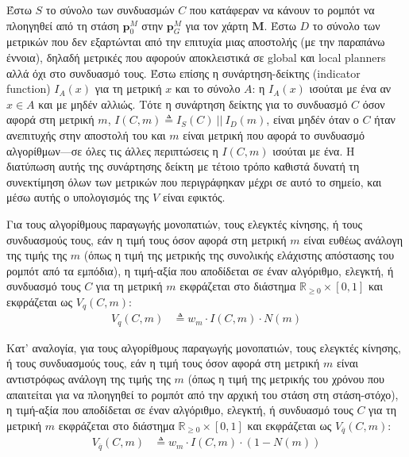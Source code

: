 Έστω $S$ το σύνολο των συνδυασμών $C$ που κατάφεραν να κάνουν το ρομπότ να
πλοηγηθεί από τη στάση $\bm{p}_0^M$ στην $\bm{p}_G^M$ για τον χάρτη $\bm{M}$.
Έστω $D$ το σύνολο των μετρικών που δεν εξαρτώνται από την επιτυχία μιας
αποστολής (με την παραπάνω έννοια), δηλαδή μετρικές που αφορούν αποκλειστικά σε
global και local planners αλλά όχι στο συνδυασμό τους. Έστω επίσης η
συνάρτηση-δείκτης (indicator function) $I_A(x)$ για τη μετρική $x$ και το
σύνολο $A$: η $I_A(x)$ ισούται με ένα αν $x \in A$ και με μηδέν αλλιώς. Τότε η
συνάρτηση δείκτης για το συνδυασμό $C$ όσον αφορά στη μετρική $m$, $I(C,m)
\triangleq I_S(C)\ ||\ I_D(m)$, είναι μηδέν όταν ο $C$ ήταν ανεπιτυχής στην
αποστολή του και $m$ είναι μετρική που αφορά το συνδυασμό αλγορίθμων---σε όλες
τις άλλες περιπτώσεις η $I(C,m)$ ισούται με ένα. Η διατύπωση αυτής της
συνάρτησης δείκτη με τέτοιο τρόπο καθιστά δυνατή τη συνεκτίμηση όλων των
μετρικών που περιγράφηκαν μέχρι σε αυτό το σημείο, και μέσω αυτής ο υπολογισμός
της $V$ είναι εφικτός.

Για τους αλγορίθμους παραγωγής μονοπατιών, τους ελεγκτές κίνησης, ή τους
συνδυασμούς τους, εάν η τιμή τους όσον αφορά στη μετρική $m$ είναι ευθέως
ανάλογη της τιμής της $m$ (όπως η τιμή της μετρικής της συνολικής ελάχιστης
απόστασης του ρομπότ από τα εμπόδια), η τιμή-αξία που αποδίδεται σε έναν
αλγόριθμο, ελεγκτή, ή συνδυασμό τους $C$ για τη μετρική $m$ εκφράζεται στο
διάστημα $\mathbb{R}_{\ge 0} \times [0,1]$ και εκφράζεται ως $V_q(C,m)$:
\begin{align}
  \label{eq:V_proportional}
  V_q(C,m) &\triangleq  w_m \cdot I(C,m) \cdot N(m)
\end{align}

Κατ' αναλογία, για τους αλγορίθμους παραγωγής μονοπατιών, τους ελεγκτές
κίνησης, ή τους συνδυασμούς τους, εάν η τιμή τους όσον αφορά στη μετρική $m$
είναι αντιστρόφως ανάλογη της τιμής της $m$ (όπως η τιμή της μετρικής του
χρόνου που απαιτείται για να πλοηγηθεί το ρομπότ από την αρχική του στάση
στη στάση-στόχο), η τιμή-αξία που αποδίδεται σε έναν αλγόριθμο, ελεγκτή, ή
συνδυασμό τους $C$ για τη μετρική $m$ εκφράζεται στο διάστημα $\mathbb{R}_{\ge
0} \times [0,1]$ και εκφράζεται ως $V_{\overline{q}}(C,m)$:
\begin{align}
  \label{eq:V_inversely_proportional}
  V_{\overline{q}}(C,m) &\triangleq  w_m \cdot I(C,m) \cdot(1 - N(m))
\end{align}

